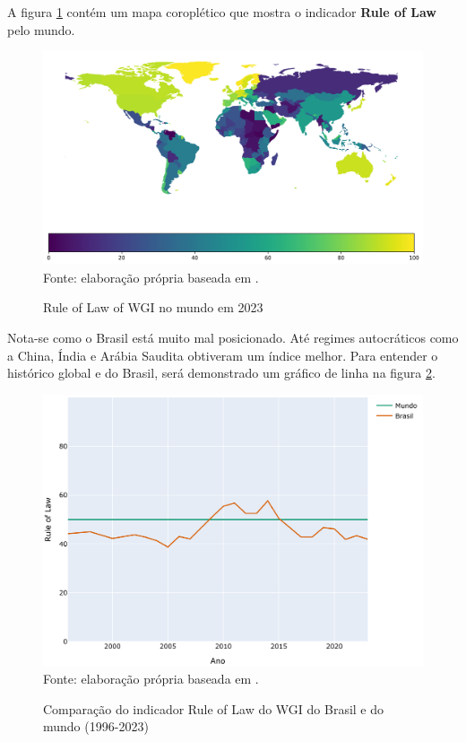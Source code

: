 A figura \ref{fig:mapa_coropletico_wgi_rl} contém um mapa coroplético que mostra  o indicador \textbf{Rule of Law} pelo mundo.
 
\begin{figure}[H]
	\centering
	\caption{Rule of Law of WGI no mundo em 2023}
	\includegraphics[width=1\linewidth]{figuras/mapa_coropletico_wgi_rl}
	\label{fig:mapa_coropletico_wgi_rl}
	\footnotesize{Fonte: elaboração própria baseada em \cite{wgi_dados}.}
\end{figure}

Nota-se como o Brasil está muito mal posicionado. Até regimes autocráticos como a China, Índia e Arábia Saudita obtiveram um índice melhor. Para entender o histórico global e do Brasil, será demonstrado um gráfico de linha na figura \ref{fig:comparacao_wgi_rl_brasil_mundo}.

\begin{figure}[H]
	\centering
	\caption{Comparação do indicador Rule of Law do WGI do Brasil e do mundo (1996-2023)}
	\includegraphics[width=1\linewidth]{figuras/comparacao_wgi_rl_brasil_mundo}
	\label{fig:comparacao_wgi_rl_brasil_mundo}
	\footnotesize{Fonte: elaboração própria baseada em \cite{wgi_dados}.}
\end{figure}

